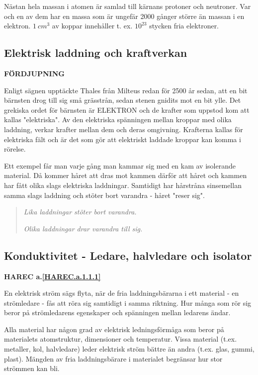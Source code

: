 Nästan hela massan i atomen är samlad till kärnans protoner och neutroner. Var
och en av dem har en massa som är ungefär 2000 gånger större än massan i en
elektron. \(1\ cm^3\) av koppar innehåller t. ex. \(10^{23}\) stycken fria
elektroner.

\subsection{Elektrisk laddning och kraftverkan}
\textbf{FÖRDJUPNING}

Enligt sägnen upptäckte Thales från Milteus redan för 2500 år sedan, att en bit
bärnsten drog till sig små grässtrån, sedan stenen gnidits mot en bit ylle. Det
grekiska ordet för bärnsten är ELEKTRON och de krafter som uppstod kom att
kallas "elektriska". Av den elektriska spänningen mellan kroppar med olika
laddning, verkar krafter mellan dem och deras omgivning. Krafterna kallas för
elektriska fält och är det som gör att elektriskt laddade kroppar kan komma i
rörelse.

Ett exempel får man varje gång man kammar sig med en kam av isolerande
material. Då kommer håret att dras mot kammen därför att håret och kammen har
fått olika slags elektriska laddningar. Samtidigt har hårstråna sinsemellan
samma slags laddning och stöter bort varandra - håret "reser sig".

\begin{quote}
\emph{Lika laddningar stöter bort varandra.}

\emph{Olika laddningar drar varandra till sig.}
\end{quote}

\subsection{Konduktivitet - Ledare, halvledare och isolator}
\textbf{HAREC a.\ref{HAREC.a.1.1.1}\label{myHAREC.a.1.1.1}}

En elektrisk ström sägs flyta, när de fria laddningsbärarna i ett material - en
strömledare - fås att röra sig samtidigt i samma riktning. Hur många som rör
sig beror på strömledarens egenskaper och spänningen mellan ledarens ändar.

Alla material har någon grad av elektrisk ledningsförmåga som beror på
materialets atomstruktur, dimensioner och temperatur. Vissa material (t.ex.
metaller, kol, halvledare) leder elektrisk ström bättre än andra (t.ex. glas,
gummi, plast). Mängden av fria laddningsbärare i materialet begränsar hur
stor strömmen kan bli.

